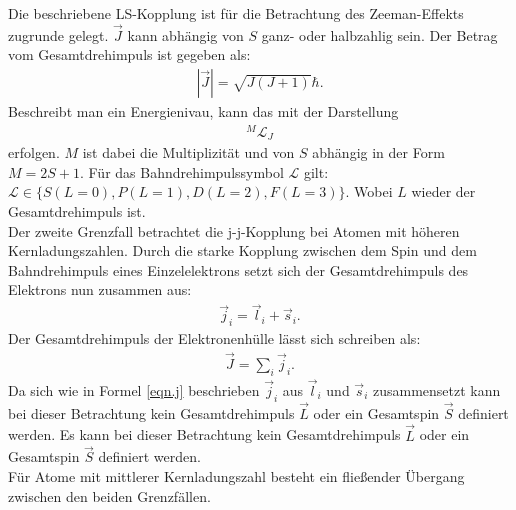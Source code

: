 Die beschriebene LS-Kopplung ist für die Betrachtung des Zeeman-Effekts zugrunde gelegt.
$\vec{J}$ kann abhängig von $S$ ganz- oder halbzahlig sein.
Der Betrag vom Gesamtdrehimpuls ist gegeben als:
\begin{align*}
  |\vec{J}| = \sqrt{J(J+1)}\hbar.
\end{align*}
Beschreibt man ein Energienivau, kann das mit der Darstellung
\begin{align*}
  {}^M\mathcal{L}_J
\end{align*}
erfolgen.
$M$ ist dabei die Multiplizität und von $S$ abhängig in der Form $M=2S+1$.
Für das Bahndrehimpulssymbol $\mathcal{L}$ gilt:
$\mathcal{L}\in\{S(L=0), P(L=1), D(L=2), F(L=3)\}$.
Wobei $L$ wieder der Gesamtdrehimpuls ist.\\
%
Der zweite Grenzfall betrachtet die j-j-Kopplung bei Atomen mit höheren Kernladungszahlen.
Durch die starke Kopplung zwischen dem Spin und dem Bahndrehimpuls eines Einzelelektrons setzt sich der Gesamtdrehimpuls des Elektrons nun zusammen aus:
\begin{align}
  \vec{j}_i = \vec{l}_i + \vec{s}_i.
  \label{eqn.j}
\end{align}
Der Gesamtdrehimpuls der Elektronenhülle lässt sich schreiben als:
\begin{align*}
  \vec{J}=\sum_i\vec{j}_i.
\end{align*}
Da sich wie in Formel \ref{eqn.j} beschrieben $\vec{j}_i$ aus $\vec{l}_i$ und $\vec{s}_i$ zusammensetzt kann bei dieser Betrachtung kein Gesamtdrehimpuls $\vec{L}$ oder ein Gesamtspin $\vec{S}$ definiert werden.
Es kann bei dieser Betrachtung kein Gesamtdrehimpuls $\vec{L}$ oder ein Gesamtspin $\vec{S}$ definiert werden.\\
Für Atome mit mittlerer Kernladungszahl besteht ein fließender Übergang zwischen den beiden Grenzfällen.
\FloatBarrier

